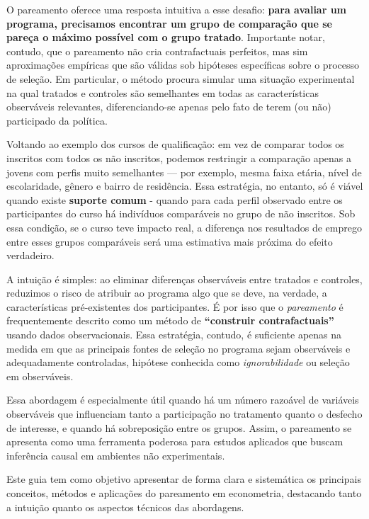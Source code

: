 O pareamento oferece uma resposta intuitiva a esse desafio: \textbf{para avaliar um programa, precisamos encontrar um grupo de comparação que se pareça o máximo possível com o grupo tratado}. Importante notar, contudo, que o pareamento não cria contrafactuais perfeitos, mas sim aproximações empíricas que são válidas sob hipóteses específicas sobre o processo de seleção. Em particular, o método procura simular uma situação experimental na qual tratados e controles são semelhantes em todas as características observáveis relevantes, diferenciando-se apenas pelo fato de terem (ou não) participado da política.


Voltando ao exemplo dos cursos de qualificação: em vez de comparar todos os inscritos com todos os não inscritos, podemos restringir a comparação apenas a jovens com perfis muito semelhantes — por exemplo, mesma faixa etária, nível de escolaridade, gênero e bairro de residência. Essa estratégia, no entanto, só é viável quando existe \textbf{suporte comum} - quando para cada perfil observado entre os participantes do curso há indivíduos comparáveis no grupo de não inscritos. Sob essa condição, se o curso teve impacto real, a diferença nos resultados de emprego entre esses grupos comparáveis será uma estimativa mais próxima do efeito verdadeiro.


A intuição é simples: ao eliminar diferenças observáveis entre tratados e controles, reduzimos o risco de atribuir ao programa algo que se deve, na verdade, a características pré-existentes dos participantes. É por isso que o \textit{pareamento} é frequentemente descrito como um método de \textbf{``construir contrafactuais''} usando dados observacionais. Essa estratégia, contudo, é suficiente apenas na medida em que as principais fontes de seleção no programa sejam observáveis e adequadamente controladas, hipótese conhecida como \textit{ignorabilidade} ou seleção em observáveis.


Essa abordagem é especialmente útil quando há um número razoável de variáveis observáveis que influenciam tanto a participação no tratamento quanto o desfecho de interesse, e quando há sobreposição entre os grupos. Assim, o pareamento se apresenta como uma ferramenta poderosa para estudos aplicados que buscam inferência causal em ambientes não experimentais.

Este guia tem como objetivo apresentar de forma clara e sistemática os principais conceitos, métodos e aplicações do pareamento em econometria, destacando tanto a intuição quanto os aspectos técnicos das abordagens.

